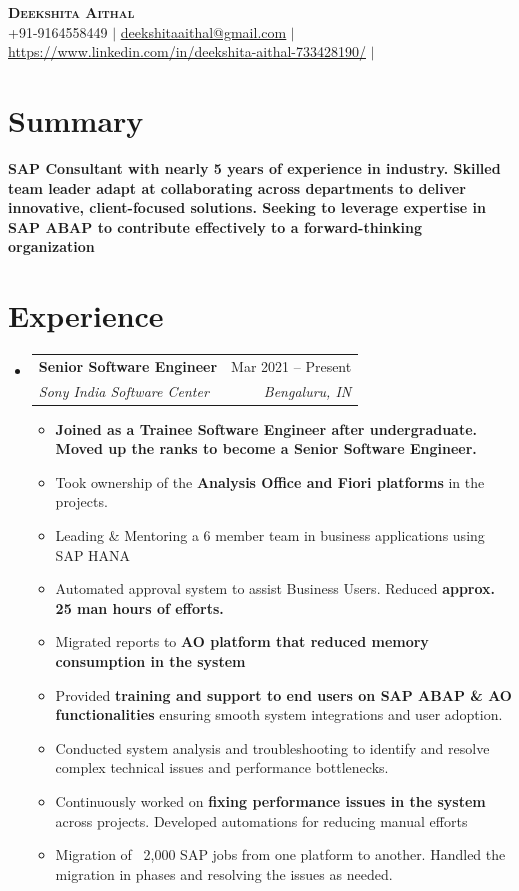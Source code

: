 \documentclass[letterpaper,11pt]{article}
\makeatletter
\newcommand{\resumeItem}[1]{
  \item\small{
    {#1 \vspace{-2pt}}
  }
}
\newcommand{\resumeSubheading}[4]{
  \vspace{-2pt}\item
    \begin{tabular*}{0.97\textwidth}[t]{l@{\extracolsep{\fill}}r}
      \textbf{#1} & #2 \\
      \textit{\small#3} & \textit{\small #4} \\
    \end{tabular*}\vspace{-7pt}
}
\newcommand{\resumeSubHeadingListStart}{\begin{itemize}[leftmargin=0.15in, label={}]}
\newcommand{\resumeSubHeadingListEnd}{\end{itemize}}
\newcommand{\resumeItemListStart}{\begin{itemize}}
\newcommand{\resumeItemListEnd}{\end{itemize}\vspace{-5pt}}
\makeatother
\begin{document}

\begin{center}
    \textbf{\Huge \scshape Deekshita Aithal} \\ \vspace{1pt}
    \small +91-9164558449 $|$ \href{mailto:deekshitaaithal@gmail.com}
    {\underline{deekshitaaithal@gmail.com}} $|$ 
    \href{https://www.linkedin.com/in/deekshita-aithal-733428190}{\underline{https://www.linkedin.com/in/deekshita-aithal-733428190/}} $|$
\end{center}

\section{Summary}
\textbf{SAP Consultant with nearly 5 years of experience in industry. Skilled team leader adapt at
collaborating across departments to deliver innovative, client-focused solutions. Seeking to
leverage expertise in SAP ABAP to contribute effectively to a forward-thinking organization}


\section{Experience}
  \resumeSubHeadingListStart
     \resumeSubheading
      {Senior Software Engineer}{Mar 2021 -- Present}
      {Sony India Software Center}{Bengaluru, IN}
      \resumeItemListStart
        \resumeItem{\textbf{Joined as a Trainee Software Engineer after undergraduate. Moved up the ranks to become a Senior Software Engineer.}}
        \resumeItem{Took ownership of the \textbf{Analysis Office and Fiori platforms} in the projects.}
        \resumeItem{Leading \& Mentoring a 6 member team in business applications using SAP HANA}
        \resumeItem{Automated approval system to assist Business Users. Reduced \textbf{approx. 25 man hours of efforts.}}
         \resumeItem{Migrated reports to \textbf{AO platform that reduced memory consumption in the system}}
        \resumeItem{Provided \textbf{training and support to end users on SAP ABAP \& AO functionalities} ensuring smooth system integrations and user adoption.}
        \resumeItem{Conducted system analysis and troubleshooting to identify and resolve complex technical issues and performance bottlenecks.}
        \resumeItem{Continuously worked on \textbf{fixing performance issues in the system} across projects. Developed automations for reducing manual efforts}
        \resumeItem{Migration of ~2,000 SAP jobs from one platform to another. Handled the migration in phases and resolving the issues as needed.}
       \resumeItemListEnd
    \resumeSubHeadingListEnd
\end{document}
